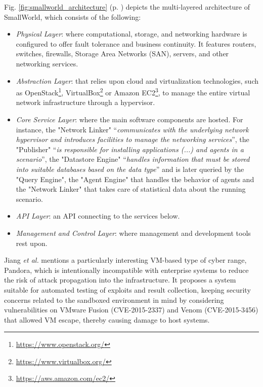 Fig. \ref{fig:smallworld_architecture} (p. \pageref{fig:smallworld_architecture}) depicts the multi-layered architecture of SmallWorld, which consists of the following:

\begin{itemize}
    \item \textit{Physical Layer}: where computational, storage, and networking hardware is configured to offer fault tolerance and business continuity. It features routers, switches, firewalls, Storage Area Networks (SAN), servers, and other networking services.
    \item \textit{Abstraction Layer}: that relies upon cloud and virtualization technologies, such as OpenStack\footnote{\url{https://www.openstack.org/}}, VirtualBox\footnote{\url{https://www.virtualbox.org/}} or Amazon EC2\footnote{\url{https://aws.amazon.com/ec2/}}, to manage the entire virtual network infrastructure through a hypervisor. 
    \item \textit{Core Service Layer}: where the main software components are hosted. For instance, the "Network Linker" ``\textit{communicates with the underlying network hypervisor and introduces facilities to manage the networking services}'', the "Publisher" ``\textit{is responsible for installing applications (...) and agents in a scenario}'', the "Datastore Engine" ``\textit{handles information that must be stored into suitable databases based on the data type}'' and is later queried by the "Query Engine", the "Agent Engine" that handles the behavior of agents and the "Network Linker" that takes care of statistical data about the running scenario.
    \item \textit{API Layer}: an API connecting to the services below. 
    \item \textit{Management and Control Layer}: where management and development tools rest upon.
\end{itemize}


Jiang \textit{et al.} \cite{pandora_ref} mentions a particularly interesting VM-based type of cyber range, Pandora, which is intentionally incompatible with enterprise systems to reduce the risk of attack propagation into the infrastructure. It proposes a system suitable for automated testing of exploits and result collection, keeping security concerns related to the sandboxed environment in mind by considering vulnerabilities on VMware Fusion (CVE-2015-2337) and Venom (CVE-2015-3456) that allowed VM escape, thereby causing damage to host systems. 

